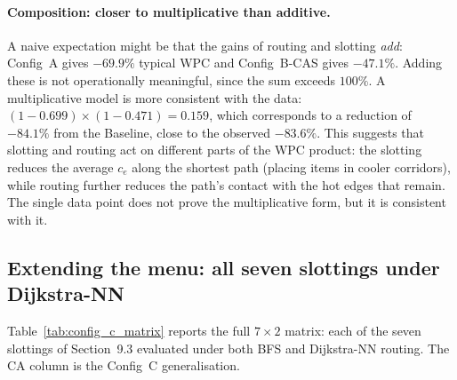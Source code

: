 \documentclass[12pt,a4paper]{article}
\begin{document}
\paragraph{Composition: closer to multiplicative than additive.}
A naive expectation might be that the gains of routing and slotting
\emph{add}: Config~A gives $-69.9\%$ typical WPC and Config~B-CAS gives
$-47.1\%$. Adding these is not operationally meaningful, since the sum
exceeds $100\%$. A multiplicative model is more consistent with the data:
$(1 - 0.699) \times (1 - 0.471) = 0.159$, which corresponds to a reduction
of $-84.1\%$ from the Baseline, close to the observed $-83.6\%$.
This suggests that slotting and routing act on different parts of the
WPC product: the slotting reduces the average $c_e$ along the shortest
path (placing items in cooler corridors), while routing further reduces
the path's contact with the hot edges that remain.
The single data point does not prove the multiplicative form, but it is
consistent with it.

\subsection{Extending the menu: all seven slottings under Dijkstra-NN}

Table~\ref{tab:config_c_matrix} reports the full $7 \times 2$ matrix:
each of the seven slottings of Section~9.3 evaluated under both BFS and
Dijkstra-NN routing.
The CA column is the Config~C generalisation.
\end{document}
